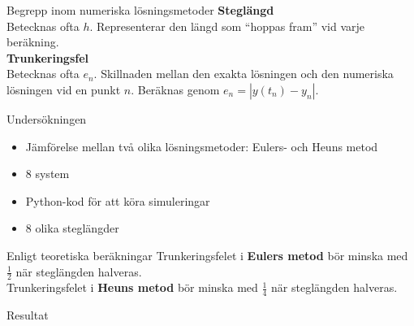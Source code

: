 \documentclass[12pt, aspectratio=169, xcolor={dvipsnames,svgnames}]{beamer}
\begin{document}
\begin{frame}{Begrepp inom numeriska lösningsmetoder}
    \textbf{Steglängd}\\ Betecknas ofta \(h\). Representerar den längd som ``hoppas fram'' vid varje beräkning.\\[1em]
    \pause
    \textbf{Trunkeringsfel}\\ Betecknas ofta \(e_n\). Skillnaden mellan den exakta lösningen och den numeriska lösningen vid en punkt \(n\). Beräknas genom \(e_n=|y(t_n)-y_n|\).
\end{frame}


\begin{frame}{Undersökningen}
    \begin{itemize}[<+- | alert@+>]

        \item Jämförelse mellan två olika lösningsmetoder: Eulers- och Heuns metod
        \item 8 system
        \item Python-kod för att köra simuleringar
        \item 8 olika steglängder
    \end{itemize}
\end{frame}

\begin{frame}{Enligt teoretiska beräkningar}
    Trunkeringsfelet i \textbf{Eulers metod} bör minska med \alert{\Large\(\frac{1}{2}\)} när steglängden halveras.\\[1.5em]
    Trunkeringsfelet i \textbf{Heuns metod} bör minska med \alert{\Large\(\frac{1}{4}\)} när steglängden halveras.
\end{frame}

\begin{frame}{Resultat}
    \begin{figure}
        \centering
        
    \end{figure}
\end{frame}
\end{document}
